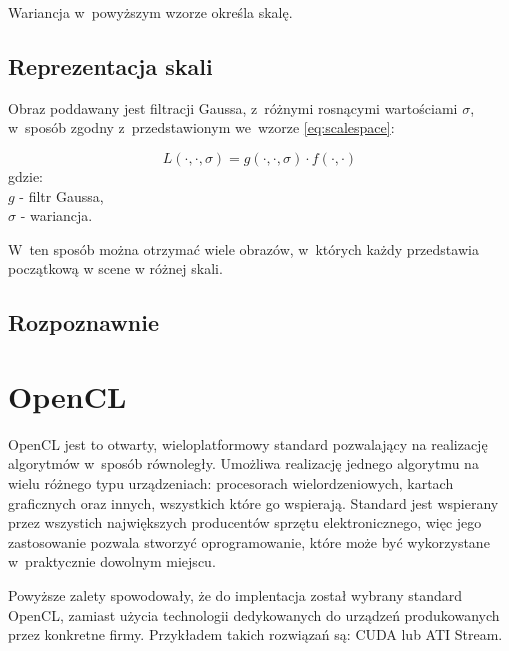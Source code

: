 Wariancja w~powyższym wzorze określa skalę. 

\subsection{Reprezentacja skali}
\label{subsec:reprezentacjaskali}
Obraz poddawany jest filtracji Gaussa, z~różnymi rosnącymi wartościami $ \sigma $, w~sposób zgodny z~przedstawionym we~wzorze \ref{eq:scalespace}:

\begin{equation}
\label{eq:scalespace}
L(\cdot,\cdot,\sigma) = g(\cdot,\cdot,\sigma)\cdot f(\cdot,\cdot)
\end{equation}
gdzie:\\
$ g $ - filtr Gaussa, \\
$ \sigma $ - wariancja.

W~ten sposób można otrzymać wiele obrazów, w~których każdy przedstawia początkową w scene w różnej skali. 

\subsection{Rozpoznawnie}
\label{subsec:rozpoznawanie}

\section{OpenCL}
\label{sec:OpenCL}

OpenCL jest to otwarty, wieloplatformowy standard pozwalający na realizację algorytmów w~sposób równoległy. Umożliwa realizację jednego algorytmu na wielu różnego typu urządzeniach: procesorach wielordzeniowych, kartach graficznych oraz innych, wszystkich które go wspierają. Standard jest wspierany przez wszystich największych producentów sprzętu elektronicznego, więc jego zastosowanie pozwala stworzyć oprogramowanie, które może być wykorzystane w~praktycznie dowolnym miejscu.

Powyższe zalety spowodowały, że do implentacja został wybrany standard OpenCL, zamiast użycia technologii dedykowanych do urządzeń produkowanych przez konkretne firmy. Przykładem takich rozwiązań są: CUDA lub ATI Stream.


